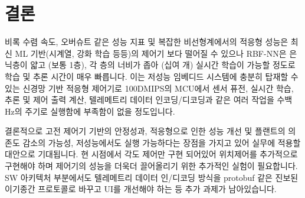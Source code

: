 \section{결론}
비록 수렴 속도, 오버슈트 같은 성능 지표 및 복잡한 비선형계에서의 적응형 성능은 최신 ML 기반(시계열, 강화 학습 등등)의 제어기 보다 떨어질 수 있으나 RBF-NN은 은닉층이 얇고 (보통 1층), 각 층의 너비가 좁아 (십여 개) 실시간 학습이 가능할 정도로 학습 및 추론 시간이 매우 빠릅니다.
%
이는 저성능 임베디드 시스템에 충분히 탑재할 수 있는 신경망 기반 적응형 제어기로 100DMIPS의 MCU에서 센서 퓨전, 실시간 학습, 추론 및 제어 출력 계산,  텔레메트리 데이터 인코딩/디코딩과 같은 여러 작업을 수백 Hz의 주기로 실행함에 부족함이 없을 정도입니다.

결론적으로 고전 제어기 기반의 안정성과, 적응형으로 인한 성능 개선 및 플랜트의 의존도 감소의 가능성, 저성능에서도 실행 가능하다는 장점을 가지고 있어 실무에 적용할 대안으로 기대됩니다.
%
현 시점에서 각도 제어만 구현 되어있어 위치제어를 추가적으로 구현해야 하며 제어기의 성능을 더욱더 끌어올리기 위한 추가적인 실험이 필요합니다. SW 아키텍처 부분에서도 텔레메트리 데이터 인/디코딩 방식을 protobuf 같은 진보된 이기종간 프로토콜로 바꾸고 UI를 개선해야 하는 등 추가 과제가 남아있습니다. 

\clearpage